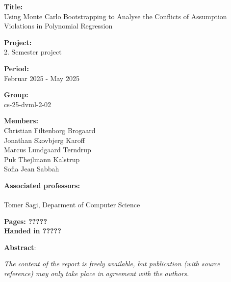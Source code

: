 \begin{minipage}[t]{0.48\textwidth}
\textbf{Title:} \\[5pt]\hspace*{2ex}
\noindent Using Monte Carlo Bootstrapping to Analyse the Conflicts of Assumption Violations in Polynomial Regression

\vspace*{2ex}

\textbf{Project:} \\[5pt]\bigskip\hspace{2ex}
2. Semester project

\textbf{Period:} \\[5pt]\bigskip\hspace{2ex}
Februar 2025 -  May 2025

\textbf{Group:} \\[5pt]\bigskip\hspace{2ex}
cs-25-dvml-2-02

\textbf{Members:} \\[5pt]\hspace*{2ex}
Christian Filtenborg Brogaard \\\hspace*{2ex}
Jonathan Skovbjerg Karoff \\\hspace*{2ex}
Marcus Lundgaard Terndrup \\\hspace*{2ex}
Puk Thejlmann Kalstrup \\\hspace*{2ex}
Sofia Jean Sabbah \\\hspace*{2ex}


\textbf{Associated professors:} \\[5pt]\hspace*{2ex}\\
Tomer Sagi, Deparment of Computer Science
\\\hspace*{2ex}

\vspace*{1cm}

\textbf{Pages: ?????} \\
\textbf{Handed in ?????}

\end{minipage}
\hfill
\begin{minipage}[t]{0.5\textwidth}
\textbf{Abstract}: \\[5pt]
\fbox{\parbox{8cm}{}}
\end{minipage}

\vfill

{\footnotesize\itshape \noindent The content of the report is freely available, but publication (with source reference) may only take place in agreement with the authors.}

